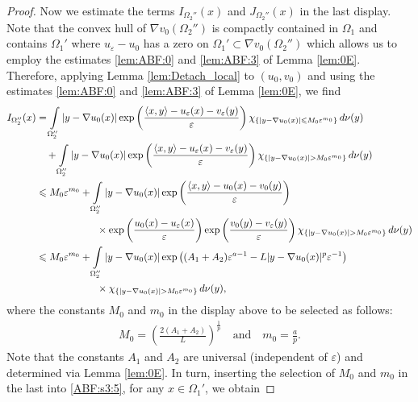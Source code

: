 \documentclass[reqno,12pt]{article}
\newcommand{\inner}[2]{\left\langle #1, #2 \right\rangle}
\newcommand{\I}{\int\limits}
\begin{document}
\begin{proof}
Now we estimate the terms $I_{\Omega_{2}''}(x)$ and $J_{\Omega_{2}''}(x)$ in the last display. Note that the convex hull of $\nabla v_{0}(\Omega_{2}'')$ is compactly contained in $\Omega_{1}$ and contains $\Omega_{1}'$ where $u_{\varepsilon}-u_{0}$ has a zero on $\Omega_{1}'\subset \nabla v_{0}(\Omega_{2}'')$ which allows us to employ the estimates \eqref{lem:ABF:0} and \eqref{lem:ABF:3} of Lemma \ref{lem:0E}. 
Therefore, applying Lemma \ref{lem:Detach_local} to $(u_{0},v_{0})$ and using the estimates \eqref{lem:ABF:0} and \eqref{lem:ABF:3} of Lemma \ref{lem:0E}, we find
    \begin{align}   
        \label{ABF:s3:5}
        I_{\Omega_{2}''}(x) &= 
        \I_{\Omega_{2}''} |y-\nabla u_{0}(x)|\exp\left(\frac{\inner{x}{y}-u_{\varepsilon}(x)-v_{\varepsilon}(y)}{\varepsilon}\right)\chi_{\{|y-\nabla u_{0}(x)|\leqslant M_0\varepsilon^{m_0} \}}\,d\nu(y)
        \notag\\&
         \quad +
        \I_{\Omega_{2}''} |y-\nabla u_{0}(x)|\exp\left(\frac{\inner{x}{y}-u_{\varepsilon}(x)-v_{\varepsilon}(y)}{\varepsilon}\right)\chi_{\{|y-\nabla u_{0}(x)|>M_0\varepsilon^{m_0} \}}\,d\nu(y)        
        \notag\\&
        \leqslant
        M_0\varepsilon^{m_0} +
        \I_{\Omega_{2}''} |y-\nabla u_{0}(x)|\exp\left(\frac{\inner{x}{y}-u_{0}(x)-v_{0}(y)}{\varepsilon}\right)
        \notag\\&
        \qquad\qquad\qquad\times
        \exp\left(\frac{u_0(x)-u_{\varepsilon}(x)}{\varepsilon}\right) \exp\left(\frac{v_0(y)-v_{\varepsilon}(y)}{\varepsilon}\right)
        \chi_{\{|y-\nabla u_{0}(x)|>M_0\varepsilon^{m_0} \}}\,d\nu(y)
        \notag\\&
        \leqslant
         M_0\varepsilon^{m_0} +
        \I_{\Omega_{2}''} |y-\nabla u_{0}(x)|\exp\left( (A_{1}+A_{2})\varepsilon^{a-1}-L|y-\nabla u_{0}(x)|^{p}\varepsilon^{-1}\right)
         \notag\\&
        \qquad\qquad\qquad\times
        \chi_{\{|y-\nabla u_{0}(x)|>M_0\varepsilon^{m_0} \}}\,d\nu(y),
    \end{align}
where the constants $M_0$ and $m_0$ in the display above to be selected as follows:
\begin{align*}
    M_0 = \left( \frac{2(A_{1}+A_{2})}{L} \right)^{\frac{1}{p}}
    \quad\text{and}\quad
    m_0 = \frac{a}{p}.
\end{align*}
Note that the constants $A_{1}$ and $A_{2}$ are universal (independent of $\varepsilon$) and determined via Lemma \ref{lem:0E}. In turn, inserting the selection of $M_0$ and $m_0$ in the last into \eqref{ABF:s3:5},  for any $x\in \Omega_{1}'$, we obtain 

\end{proof}
\end{document}
